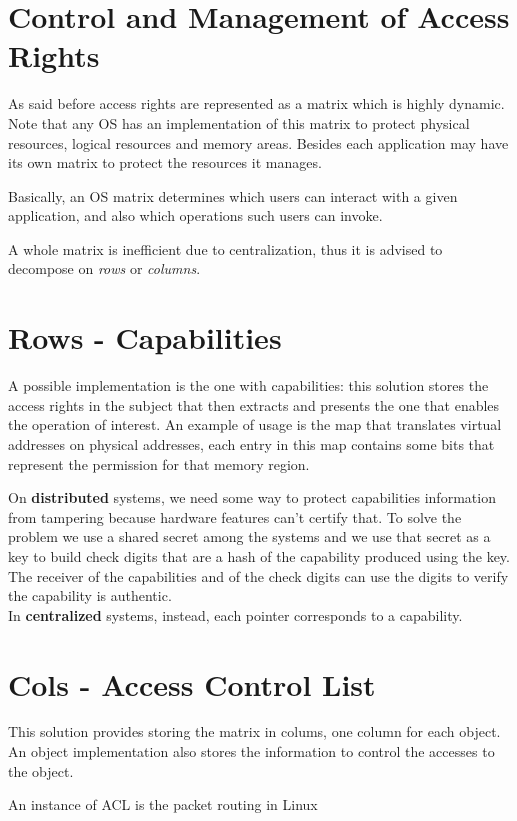 \section{Control and Management of Access Rights}
As said before access rights are represented as a matrix which is highly dynamic.\\
Note that any OS has an implementation of this matrix to protect physical resources, logical resources and memory areas.
Besides each application may have its own matrix to protect the resources it manages.

Basically, an OS matrix determines which users can interact with a given application,
and also which operations such users can invoke.

A whole matrix is inefficient due to centralization, thus it is advised to decompose on \textit{rows} or \textit{columns}.

\section{Rows - Capabilities}
A possible implementation is the one with capabilities: this solution stores the access rights in the
subject that then extracts and presents the one that enables the operation of interest.
An example
of usage is the map that translates virtual addresses on physical addresses, each entry in this map
contains some bits that represent the permission for that memory region.

On \textbf{distributed} systems, we need some way to protect capabilities information from tampering because hardware features can’t certify that.
To solve the problem we use a shared secret among the systems and we use that secret as a key to build check digits that are a hash of the capability
produced using the key.
The receiver of the capabilities and of the check digits can use the digits to verify the capability is authentic.\\
In \textbf{centralized} systems, instead, each pointer corresponds to a capability.

\section{Cols - Access Control List}
This solution provides storing the matrix in colums, one column for each object.
An object implementation also stores the information to control the accesses to the object.

An instance of ACL is the packet routing in Linux